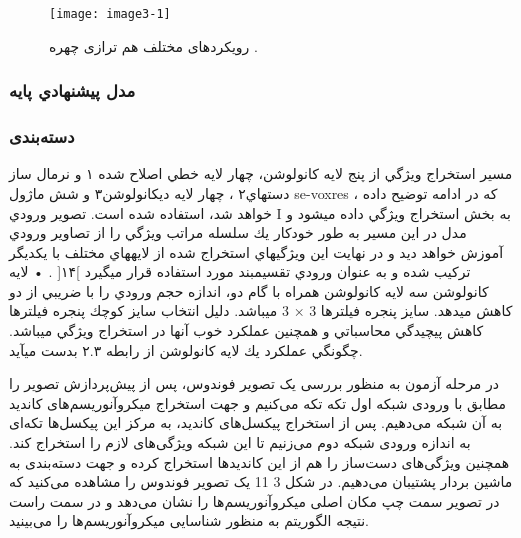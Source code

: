  \begin{figure}[h]
\centering
  \texttt{[image: image3-1]}
  \caption{رویکردهای مختلف هم ترازی چهره \cite{ref1}.}
  \label{image2-1}
\end{figure}

\subsubsection{مدل پيشنهادي پايه}

\subsubsection{دسته‌بندی}
مسير استخراج ويژگي از پنج لايه كانولوشن، چهار لايه خطي اصلاح شده ۱ و نرمال ساز دستهاي۲ ، چهار لايه ديكانولوشن۳ و شش ماژول se-voxres ، كه در ادامه توضيح داده خواهد شد، استفاده شده است. تصوير ورودي I به بخش استخراج ويژگي داده ميشود و مدل در اين مسير به طور خودكار يك سلسله مراتب ويژگي را از تصاوير ورودي آموزش خواهد ديد و در نهايت اين ويژگيهاي استخراج شده از لايههاي مختلف با يكديگر
تركيب شده و به عنوان ورودي تقسيمبند مورد استفاده قرار ميگيرد ]۱۴[ .
• لايه كانولوشن
سه لايه كانولوشن همراه با گام دو، اندازه حجم ورودي را با ضريبي از دو كاهش ميدهد. سايز پنجره فيلترها 3 × 3 ميباشد. دليل انتخاب سايز كوچك پنجره فيلترها كاهش پيچيدگي محاسباتي و همچنين عملكرد خوب آنها در استخراج ويژگي ميباشد. چگونگي عملكرد يك لايه كانولوشن از رابطه ۲.۳ بدست
ميآيد.

در مرحله آزمون به منظور بررسی یک تصویر فوندوس، پس از پیش‌پردازش تصویر را مطابق با ورودی شبکه اول تکه تکه می‌کنیم و جهت استخراج میکروآنوریسم‌های کاندید به آن شبکه می‌دهیم. پس از استخراج پیکسل‌های کاندید، به مرکز این پیکسل‌ها تکه‌ای به اندازه ورودی شبکه دوم می‌زنیم تا این شبکه ویژگی‌های لازم را استخراج کند. همچنین ویژگی‌های دست‌ساز را هم از این کاندیدها استخراج کرده و جهت دسته‌بندی به ماشین بردار پشتیبان می‌دهیم. در شکل ‏3 11 یک تصویر فوندوس را مشاهده می‌کنید که در تصویر سمت چپ مکان اصلی میکروآنوریسم‌ها را نشان می‌دهد و در سمت راست نتیجه الگوریتم به منظور شناسایی میکروآنوریسم‌ها را می‌بینید.

